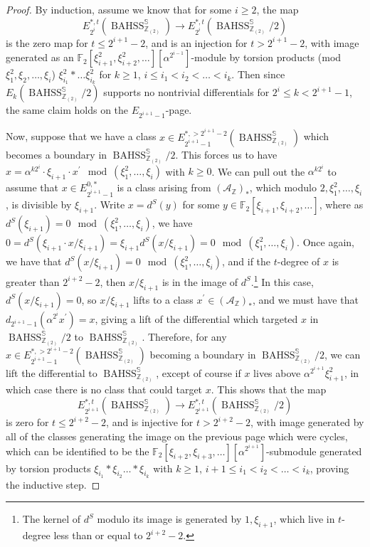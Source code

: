 \documentclass[11pt,leqno]{article}
\newcommand{\zz}{\mathbb{Z}}
\newcommand{\sss}{\mathbb{S}}
\newcommand{\mc}[1]{\mathcal{#1}}
\newcommand{\fff}{\mathbb{F}}
\newcommand{\mo}[1]{\operatorname{#1}}
\newtheorem*{short hand}{theorem name}
\theoremstyle{plain}  %
\theoremstyle{definition}
\numberwithin{equation}{section}
\begin{document}
\begin{proof}
By induction, assume we know that for some $i\geq 2$, the map $$E_{2^{i}}^{*,t}(\mo{BAHSS}_{\zz_{(2)}}^{\sss})\to E_{2^{i}}^{*,t}(\mo{BAHSS}_{\zz_{(2)}}^{\sss}/2)$$ is the zero map for $t\leq 2^{i+1}-2$, and is an injection for $t>2^{i+1}-2$, with image generated as an $\fff_2[\xi_{i+1}^2, \xi_{i+2}^2,\ldots][\alpha^{2^{i-1}}]$-module by torsion products (mod $\xi_1^2,\xi_2,\ldots,\xi_i$) $\xi_{i_1}^2*\ldots \xi_{i_k}^2$ for $k\geq 1$, $i\leq i_1<i_2<\ldots <i_k$.  Then since $E_{k}(\mo{BAHSS}_{\zz_{(2)}}^{\sss}/2)$ supports no nontrivial differentials for $2^i\leq k<2^{i+1}-1$, the same claim holds on the $E_{2^{i+1}-1}$-page.   

Now, suppose that we have a class $x\in E_{2^{i+1}-1}^{*,>2^{i+1}-2}(\mo{BAHSS}_{\zz_{(2)}}^{\sss})$ which becomes a boundary in $\mo{BAHSS}_{\zz_{(2)}}^{\sss}/2$.  This forces us to have $x=\alpha^{k2^{i}}\cdot \xi_{i+1}\cdot x^{\prime}\mod(\xi_1^2,\ldots, \xi_{i})$ with $k\geq 0$.  We can pull out the $\alpha^{k2^i}$ to assume that $x\in E_{2^{i+1}-1}^{0,*}$ is a class arising from $(\mc{A}_{\zz})_*$, which modulo $2,\xi_1^2,\ldots,\xi_{i}$, is divisible by $\xi_{i+1}$.  Write $x=d^S(y)$ for some $y\in \fff_2[\xi_{i+1},\xi_{i+2},\ldots]$, where as $d^S(\xi_{i+1})=0 \mod (\xi_1^2,\ldots,\xi_{i})$, we have $0=d^S(\xi_{i+1}\cdot x/\xi_{i+1})=\xi_{i+1}d^S(x/\xi_{i+1})=0\mod (\xi_1^2,\ldots,\xi_{i})$.  Once again, we have that $d^S(x/\xi_{i+1})=0\mod (\xi_1^2,\ldots,\xi_{i})$, and if the $t$-degree of $x$ is greater than $2^{i+2}-2$, then $x/\xi_{i+1}$ is in the image of $d^S$.\footnote{The kernel of $d^S$ modulo its image is generated by $1,\xi_{i+1}$, which live in $t$-degree less than or equal to $2^{i+2}-2$.}  In this case, $d^S(x/\xi_{i+1})=0$, so $x/\xi_{i+1}$ lifts to a class $x^{\prime}\in(\mc{A}_{\zz})_*$, and we must have that $d_{2^{i+1}-1}(\alpha^{2^{i}}x^{\prime})=x$, giving a lift of the differential which targeted $x$ in $\mo{BAHSS}_{\zz_{(2)}}^{\sss}/2$ to $\mo{BAHSS}_{\zz_{(2)}}^{\sss}$.  Therefore, for any $x\in E_{2^{i+1}-1}^{*,>2^{i+1}-2}(\mo{BAHSS}_{\zz_{(2)}}^{\sss})$ becoming a boundary in $\mo{BAHSS}_{\zz_{(2)}}^{\sss}/2$, we can lift the differential to $\mo{BAHSS}_{\zz_{(2)}}^{\sss}$, except of course if $x$ lives above $\alpha^{2^{i+1}}\xi_{i+1}^{2}$, in which case there is no class that could target $x$.  This shows that the map $$E_{2^{i+1}}^{*,t}(\mo{BAHSS}_{\zz_{(2)}}^{\sss})\to E_{2^{i+1}}^{*,t}(\mo{BAHSS}_{\zz_{(2)}}^{\sss}/2)$$ is zero for $t\leq 2^{i+2}-2$, and is injective for $t>2^{i+2}-2$, with image generated by all of the classes generating the image on the previous page which were cycles, which can be identified to be the $\fff_2[\xi_{i+2},\xi_{i+3},\ldots][\alpha^{2^{i+1}}]$-submodule generated by torsion products $\xi_{i_1}*\xi_{i_2}\ldots *\xi_{i_k}$ with $k\geq 1$, $i+1\leq i_1<i_2<\ldots <i_k$, proving the inductive step.


\end{proof}
\end{document}
